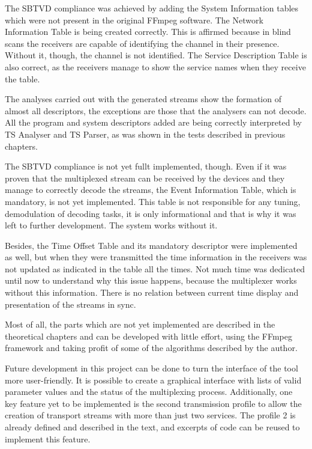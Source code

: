 \documentclass[
	12pt,				%
	openright,			%
	twoside,			%
	a4paper,			%
	brazil,
	french,				%
	english
	]{abntex2}
\begin{document}
The SBTVD compliance was achieved by adding the System Information tables which were not present in the original FFmpeg software. The Network Information Table is being created correctly. This is affirmed because in blind scans the receivers are capable of identifying the channel in their presence. Without it, though, the channel is not identified. The Service Description Table is also correct, as the receivers manage to show the service names when they receive the table.

The analyses carried out with the generated streams show the formation of almost all descriptors, the exceptions are those that the analysers can not decode. All the program and system descriptors added are being correctly interpreted by TS Analyser and TS Parser, as was shown in the tests described in previous chapters.

The SBTVD compliance is not yet fullt implemented, though. Even if it was proven that the multiplexed stream can be received by the devices and they manage to correctly decode the streams, the Event Information Table, which is mandatory, is not yet implemented. This table is not responsible for any tuning, demodulation of decoding tasks, it is only informational and that is why it was left to further development. The system works without it.

Besides, the Time Offset Table and its mandatory descriptor were implemented as well, but when they were transmitted the time information in the receivers was not updated as indicated in the table all the times. Not much time was dedicated until now to understand why this issue happens, because the multiplexer works without this information. There is no relation between current time display and presentation of the streams in sync.

Most of all, the parts which are not yet implemented are described in the theoretical chapters and can be developed with little effort, using the FFmpeg framework and taking profit of some of the algorithms described by the author.

Future development in this project can be done to turn the interface of the tool more user-friendly. It is possible to create a graphical interface with lists of valid parameter values and the status of the multiplexing process. Additionally, one key feature yet to be implemented is the second transmission profile to allow the creation of transport streams with more than just two services. The profile 2 is already defined and described in the text, and excerpts of code can be reused to implement this feature.
\end{document}
